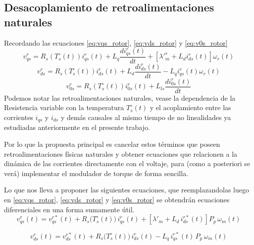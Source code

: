 \documentclass[12pt, a4paper,journal, onecolumn, compsoc]{IEEEtran}
\begin{document}
\subsection{Desacoplamiento de retroalimentaciones naturales}
Recordando las ecuaciones \eqref{eq:vqs_rotor}, \eqref{eq:vds_rotor} y \eqref{eq:v0s_rotor}
    \begin{equation*}
        v^r_{qs}=R_s(T_s^\circ(t))i^r_{qs}(t) + L_q\frac{d i^r_{qs}(t)}{dt}+[\lambda'^r_m + L_d i^r_{ds}(t)]\omega_r(t)
    \end{equation*}
    \begin{equation*}
        v_{ds}^r=R_s(T_s^\circ(t))i^r_{ds}(t)+L_d\frac{d i^r_{ds}(t)}{dt} - L_qi^r_{qs}(t)\omega_r(t)
    \end{equation*}
    \begin{equation*}
        v^r_{0s}=R_s(T_s^\circ(t))i^r_{0s}(t)+L_{ls}\frac{d i^r_{0s}(t)}{dt}
    \end{equation*}
Podemos notar las retroalimentaciones naturales, vease la dependencia de la Resistencia variable con la temperatura $T_s^\circ(t)$ y el acoplamiento entre las corrientes $i_{qs}$ y $i_{ds}$ y demás causales al mismo tiempo de no linealidades ya estudiadas anteriormente en el presente trabajo.

Por lo que la propuesta principal es cancelar estos términos que poseen retroalimentaciones físicas naturales y obtener ecuaciones que relacionen a la dinámica de las corrientes directamente con el voltaje, para (como a posteriori se verá) implementar el modulador de torque de forma sencilla.

Lo que nos lleva a proponer las siguientes ecuaciones, que reemplazandolas luego en \eqref{eq:vqs_rotor}, \eqref{eq:vds_rotor} y \eqref{eq:v0s_rotor} se obtendrán ecuaciones diferenciales en una forma sumamente útil.
\begin{equation}
v_{qs}^{r}(t) = v_{qs}^{r*}(t) 
+ R_s\!\big(T_s^{\circ}(t)\big)\, i_{qs}^{r}(t) 
+ \left[\lambda'_m + L_d\, i_{ds}^{r*}(t)\right] P_p\, \omega_m(t)
\label{eq:vqs_r}
\end{equation}

\begin{equation}
v_{ds}^{r}(t) = v_{ds}^{r*}(t) 
+ R_s\!\big(T_s^{\circ}(t)\big)\, i_{ds}^{r}(t) 
- L_q\, i_{qs}^{r*}(t)\, P_p\, \omega_m(t)
\label{eq:vds_r}
\end{equation}
\end{document}
